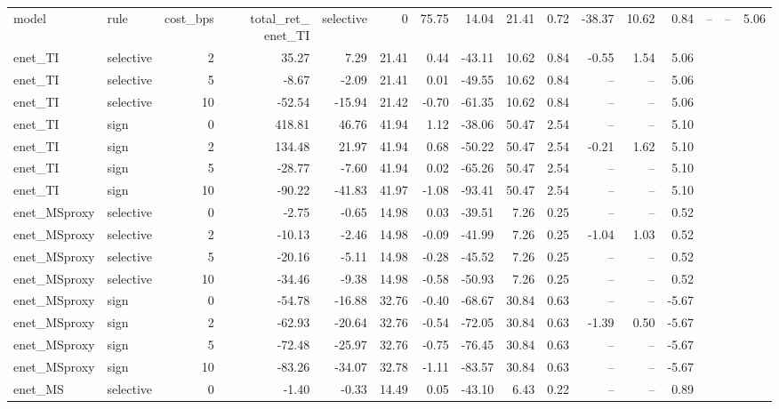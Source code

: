 \begin{tabular}{llrrrrrrrrrrr}
\toprule
model & rule & cost_bps & total_ret_%
\midrule
enet_TI & selective & 0 & 75.75 & 14.04 & 21.41 & 0.72 & -38.37 & 10.62 & 0.84 & -- & -- & 5.06 \\
enet_TI & selective & 2 & 35.27 & 7.29 & 21.41 & 0.44 & -43.11 & 10.62 & 0.84 & -0.55 & 1.54 & 5.06 \\
enet_TI & selective & 5 & -8.67 & -2.09 & 21.41 & 0.01 & -49.55 & 10.62 & 0.84 & -- & -- & 5.06 \\
enet_TI & selective & 10 & -52.54 & -15.94 & 21.42 & -0.70 & -61.35 & 10.62 & 0.84 & -- & -- & 5.06 \\
enet_TI & sign & 0 & 418.81 & 46.76 & 41.94 & 1.12 & -38.06 & 50.47 & 2.54 & -- & -- & 5.10 \\
enet_TI & sign & 2 & 134.48 & 21.97 & 41.94 & 0.68 & -50.22 & 50.47 & 2.54 & -0.21 & 1.62 & 5.10 \\
enet_TI & sign & 5 & -28.77 & -7.60 & 41.94 & 0.02 & -65.26 & 50.47 & 2.54 & -- & -- & 5.10 \\
enet_TI & sign & 10 & -90.22 & -41.83 & 41.97 & -1.08 & -93.41 & 50.47 & 2.54 & -- & -- & 5.10 \\
enet_MSproxy & selective & 0 & -2.75 & -0.65 & 14.98 & 0.03 & -39.51 & 7.26 & 0.25 & -- & -- & 0.52 \\
enet_MSproxy & selective & 2 & -10.13 & -2.46 & 14.98 & -0.09 & -41.99 & 7.26 & 0.25 & -1.04 & 1.03 & 0.52 \\
enet_MSproxy & selective & 5 & -20.16 & -5.11 & 14.98 & -0.28 & -45.52 & 7.26 & 0.25 & -- & -- & 0.52 \\
enet_MSproxy & selective & 10 & -34.46 & -9.38 & 14.98 & -0.58 & -50.93 & 7.26 & 0.25 & -- & -- & 0.52 \\
enet_MSproxy & sign & 0 & -54.78 & -16.88 & 32.76 & -0.40 & -68.67 & 30.84 & 0.63 & -- & -- & -5.67 \\
enet_MSproxy & sign & 2 & -62.93 & -20.64 & 32.76 & -0.54 & -72.05 & 30.84 & 0.63 & -1.39 & 0.50 & -5.67 \\
enet_MSproxy & sign & 5 & -72.48 & -25.97 & 32.76 & -0.75 & -76.45 & 30.84 & 0.63 & -- & -- & -5.67 \\
enet_MSproxy & sign & 10 & -83.26 & -34.07 & 32.78 & -1.11 & -83.57 & 30.84 & 0.63 & -- & -- & -5.67 \\
enet_MS & selective & 0 & -1.40 & -0.33 & 14.49 & 0.05 & -43.10 & 6.43 & 0.22 & -- & -- & 0.89 \\

\end{tabular}
